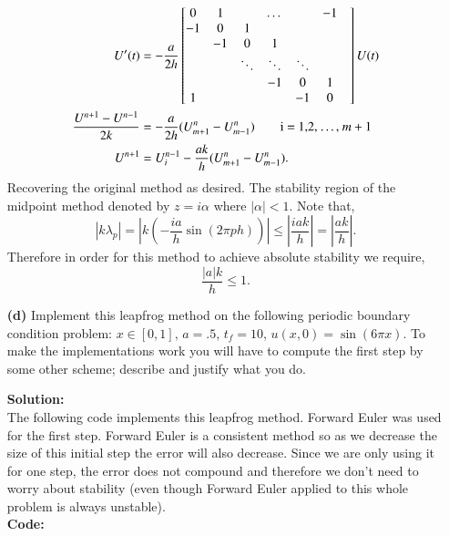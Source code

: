 \documentclass[12pt]{article}
\makeatletter
\theoremstyle{homework}
\newenvironment{exercise}[1]
{\def\@currentlabel{#1}\exercisecore}
{\endexercisecore}
\newcommand{\localhead}[1]{\par\smallskip\noindent\textbf{#1}\nobreak\\}%
\newcommand\solution{\localhead{Solution:}}
\makeatother
\begin{document}
\begin{exercise}{Problem P37}
\begin{enumerate}
    \begin{align*}
      U'(t) &= - \dfrac{a}{2h}\begin{bmatrix}
        0 & 1  &       & \dots  &       &-1 \\
       -1 & 0  & 1     &        &       &\\
          & -1 &     0 &1       &       &\\
          &    &\ddots &\ddots  &\ddots &\\
          &    &       &-1      & 0     & 1 &\\
         1&    &       &        &-1     & 0  &
       \end{bmatrix}
       U(t)\\
       \dfrac{U^{n+1} - U^{n-1}}{2k} &=  - \frac{a}{2h}(U_{m+1}^n - U_{m-1}^n) \qquad \text{i = 1,2, \dots, $m+1$}\\
       U^{n+1}&=  U_i^{n - 1} - \frac{ak}{h}(U_{m+1}^n - U_{m-1}^n).
    \end{align*}
    Recovering the original method as desired. The stability region of the midpoint method denoted by $z = i\alpha$ where $|\alpha| < 1$. Note that, 
    \begin{equation*}
      |k\lambda_p| = |k(-\frac{ia}{h}\sin(2\pi ph))| \leq \left|\frac{iak}{h}\right| = \left|\frac{ak}{h}\right|.
    \end{equation*}
    Therefore in order for this method to achieve absolute stability 
    we require, 
    \begin{equation*}
      \frac{|a|k}{h}\leq 1.
    \end{equation*}
    \vspace*{.15in}



    \item[\textbf{(d)}] Implement this leapfrog method on the following periodic boundary condition problem: $x \in [0, 1]$, $a = .5$, $t_f = 10$, $u(x, 0) = \sin(6\pi x)$. To make the implementations work you will have to compute the first step by some other scheme; describe and justify what you do. 
    \solution The following code implements this leapfrog method. Forward Euler was used for the first step. Forward Euler is a consistent method so as we decrease the size of this initial step the error will also decrease. Since we are only using it for one step, the error does not compound and therefore we don't need to worry about stability (even though Forward Euler applied to this whole problem is always unstable). \\
      \textbf{Code:}
      \begin{center}
        
      \end{center}
      \vspace*{.15in}




\end{enumerate}
\end{exercise}
\end{document}
